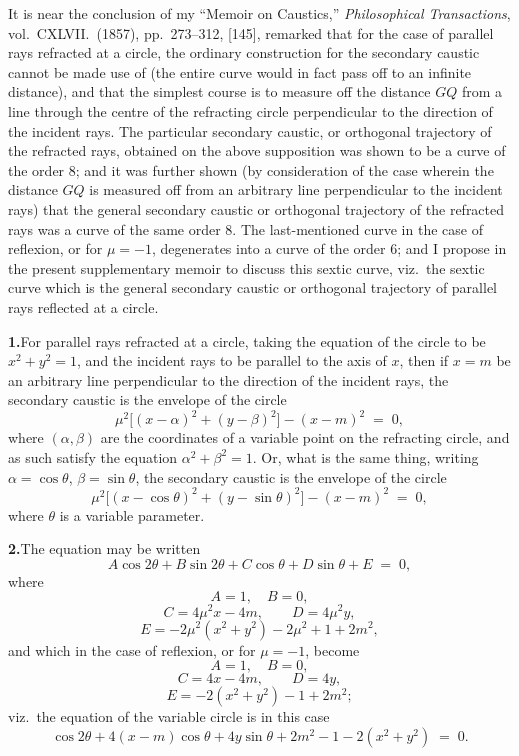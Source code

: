 \documentclass[11pt]{article}
\begin{document}
\medskip{}

\medskip

It is near the conclusion of my ``Memoir on Caustics,'' \textit{Philosophical Transactions}, vol.\ CXLVII.\ (1857), pp.\ 273--312, [145], remarked that for the case of parallel rays refracted at a circle, the ordinary construction for the secondary caustic cannot be made use of (the entire curve would in fact pass off to an infinite distance), and that the simplest course is to measure off the distance $GQ$ from a line through the centre of the refracting circle perpendicular to the direction of the incident rays. The particular secondary caustic, or orthogonal trajectory of the refracted rays, obtained on the above supposition was shown to be a curve of the order 8; and it was further shown (by consideration of the case wherein the distance $GQ$ is measured off from an arbitrary line perpendicular to the incident rays) that the general secondary caustic or orthogonal trajectory of the refracted rays was a curve of the same order 8. The last-mentioned curve in the case of reflexion, or for $\mu = -1$, degenerates into a curve of the order 6; and I propose in the present supplementary memoir to discuss this sextic curve, viz.\ the sextic curve which is the general secondary caustic or orthogonal trajectory of parallel rays reflected at a circle.

\textbf{1.}\quad For parallel rays refracted at a circle, taking the equation of the circle to be $x^{2} + y^{2} = 1$, and the incident rays to be parallel to the axis of $x$, then if $x = m$ be an arbitrary line perpendicular to the direction of the incident rays, the secondary caustic is the envelope of the circle
\[
\mu^{2}\bigl[(x - \alpha)^{2} + (y - \beta)^{2}\bigr] - (x - m)^{2} \;=\; 0,
\]
where $(\alpha, \beta)$ are the coordinates of a variable point on the refracting circle, and as such satisfy the equation $\alpha^{2} + \beta^{2} = 1$. Or, what is the same thing, writing $\alpha = \cos\theta$, $\beta = \sin\theta$, the secondary caustic is the envelope of the circle
\[
\mu^{2}\bigl[(x - \cos\theta)^{2} + (y - \sin\theta)^{2}\bigr] - (x - m)^{2} \;=\; 0,
\]
where $\theta$ is a variable parameter.

\textbf{2.}\quad The equation may be written
\[
A\cos 2\theta + B\sin 2\theta + C\cos\theta + D\sin\theta + E \;=\; 0,
\]
where
\[
A = 1,\quad B = 0,
\]
\[
C = 4\mu^{2} x - 4 m,\qquad D = 4\mu^{2} y,
\]
\[
E = -2\mu^{2}(x^{2} + y^{2}) - 2\mu^{2} + 1 + 2 m^{2},
\]
and which in the case of reflexion, or for $\mu = -1$, become
\[
A = 1,\quad B = 0,
\]
\[
C = 4 x - 4 m,\qquad D = 4 y,
\]
\[
E = -2(x^{2} + y^{2}) - 1 + 2 m^{2};
\]
viz.\ the equation of the variable circle is in this case
\[
\cos 2\theta + 4(x - m)\cos\theta + 4 y\sin\theta + 2 m^{2} - 1 - 2(x^{2} + y^{2}) \;=\; 0.
\]
\end{document}
